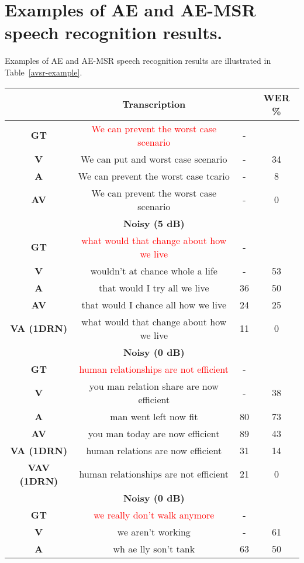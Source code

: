 \documentclass[10pt,twocolumn,letterpaper]{article}
\begin{document}
\section{Examples of AE and AE-MSR speech recognition results.}\label{AE-MSR}
Examples of AE and AE-MSR speech recognition results are illustrated in Table~\ref{avsr-example}.
\begin{table}[h]\footnotesize
\renewcommand\tabcolsep{1.5pt}
\begin{center}
\begin{tabular}{cccc}
\toprule
& {\bf Transcription} & & {\bf WER \%} \\
\midrule
{\bf GT} & \textcolor{red}{We can prevent the worst case scenario} &-&\\
{\bf V} & We can put and worst case scenario &-& 34 \\
{\bf A} & We can prevent the worst case tcario &-& 8 \\
{\bf AV} & We can prevent the worst case scenario &-& 0 \\
\midrule
&{\bf Noisy (5 dB)}&&\\
{\bf GT} & \textcolor{red}{what would that change about how we live} &-&\\
{\bf V} & wouldn't at chance whole a life &-& 53 \\
{\bf A} & that would I try all we live &36& 50 \\
{\bf AV} & that would I chance all how we live &24& 25 \\
{\bf VA (1DRN)} & what would that change about how we live &11& 0 \\
\midrule
&{\bf Noisy (0 dB)}&&\\
{\bf GT} & \textcolor{red}{human relationships are not efficient}  &-&\\
{\bf V} & you man relation share are now efficient &-& 38 \\
{\bf A} & man went left now fit &80& 73 \\
{\bf AV} & you man today are now efficient &89& 43 \\
{\bf VA (1DRN)} & human relations are now efficient &31& 14 \\
{\bf VAV (1DRN)} & human relationships are not efficient &21& 0 \\
\midrule
&{\bf Noisy (0 dB)}&&\\
{\bf GT} & \textcolor{red}{we really don't walk anymore}  &-&\\
{\bf V} & we aren't working&-& 61 \\
{\bf A} & wh ae lly son't tank  &63& 50 \\

\end{tabular}
\end{center}
\end{table}
\end{document}
